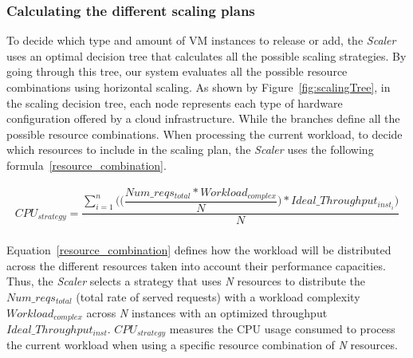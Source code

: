 \subsubsection{Calculating the different scaling plans}

To decide which type and amount of VM instances to release or add, the \emph{Scaler} uses an optimal decision tree that calculates all the possible scaling strategies. By going through this tree, our system evaluates all the possible resource combinations using horizontal scaling. As shown by Figure~\ref{fig:scalingTree}, in the scaling decision tree, each node represents each type of hardware configuration offered by a cloud infrastructure. While the branches define all the possible resource combinations. When processing the current workload, to decide which resources to include in the scaling plan,  the \emph{Scaler} uses the following formula~\ref{resource_combination}. 



{\scriptsize
\begin{equation}\label{resource_combination}
\begin{split}
CPU_{strategy} = \dfrac{ \sum_{i=1}^n \bigg( \bigg( \dfrac{ Num\_reqs_{total} * Workload_{complex} }  {N}  \bigg) * Ideal\_Throughput_{inst_{i}} \bigg) }  {N} \\ 
\end{split}
\end{equation}
}

Equation~\ref{resource_combination} defines how the workload will be distributed across the different resources taken into account their performance capacities.  Thus, the \emph{Scaler} selects a strategy that uses \emph{N} resources to distribute the \emph{$Num\_reqs_{total}$} (total rate of served requests) with a workload complexity \emph{$Workload_{complex}$} across \emph{N} instances with an optimized throughput \emph{$Ideal\_Throughput_{inst}$}. \emph{$CPU_{strategy}$} measures the CPU usage consumed to process the current workload when using a specific resource combination of \emph{N} resources.



